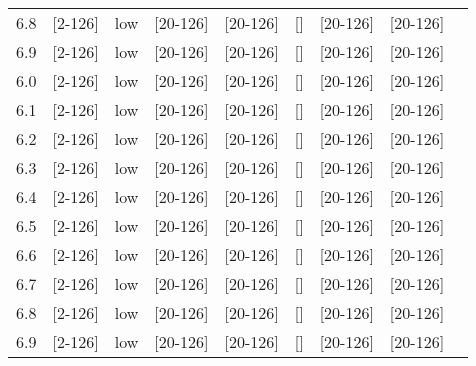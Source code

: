 \documentclass{article}
\begin{document}
\begin{tabular}{| l | l | l | l | l | l | l | l | l |}
      6.8 & [2-126] & low & [20-126] & [20-126] & [] & [20-126] & [20-126] &\\
      6.9 & [2-126] & low & [20-126] & [20-126] & [] & [20-126] & [20-126] &\\
      6.0 & [2-126] & low & [20-126] & [20-126] & [] & [20-126] & [20-126] &\\
      6.1 & [2-126] & low & [20-126] & [20-126] & [] & [20-126] & [20-126] &\\
      6.2 & [2-126] & low & [20-126] & [20-126] & [] & [20-126] & [20-126] &\\
      6.3 & [2-126] & low & [20-126] & [20-126] & [] & [20-126] & [20-126] &\\
      6.4 & [2-126] & low & [20-126] & [20-126] & [] & [20-126] & [20-126] &\\
      6.5 & [2-126] & low & [20-126] & [20-126] & [] & [20-126] & [20-126] &\\
      6.6 & [2-126] & low & [20-126] & [20-126] & [] & [20-126] & [20-126] &\\
      6.7 & [2-126] & low & [20-126] & [20-126] & [] & [20-126] & [20-126] &\\
      6.8 & [2-126] & low & [20-126] & [20-126] & [] & [20-126] & [20-126] &\\
      6.9 & [2-126] & low & [20-126] & [20-126] & [] & [20-126] & [20-126] &\\
      \hline
    \end{tabular}
\end{document}
